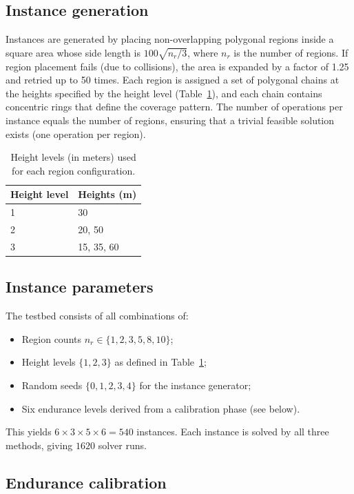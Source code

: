 \documentclass[12pt]{elsarticle}
\begin{document}
\subsection{Instance generation}
\label{sec:instance-gen}

Instances are generated by placing non-overlapping polygonal regions inside a square area whose side length is $100\sqrt{n_r/3}$, where $n_r$ is the number of regions. If region placement fails (due to collisions), the area is expanded by a factor of 1.25 and retried up to 50 times. Each region is assigned a set of polygonal chains at the heights specified by the height level (Table~\ref{tab:height-levels}), and each chain contains concentric rings that define the coverage pattern. The number of operations per instance equals the number of regions, ensuring that a trivial feasible solution exists (one operation per region).

\begin{table}[h!]
\centering
\caption{Height levels (in meters) used for each region configuration.}
\label{tab:height-levels}
\begin{tabular}{ll}
\toprule
Height level & Heights (m) \\
\midrule
1 & 30 \\
2 & 20, 50 \\
3 & 15, 35, 60 \\
\bottomrule
\end{tabular}
\end{table}

\subsection{Instance parameters}
\label{sec:params}

The testbed consists of all combinations of:
\begin{itemize}
    \item Region counts $n_r \in \{1, 2, 3, 5, 8, 10\}$;
    \item Height levels $\{1, 2, 3\}$ as defined in Table~\ref{tab:height-levels};
    \item Random seeds $\{0, 1, 2, 3, 4\}$ for the instance generator;
    \item Six endurance levels derived from a calibration phase (see below).
\end{itemize}
This yields $6 \times 3 \times 5 \times 6 = 540$ instances. Each instance is solved by all three methods, giving $1620$ solver runs.

\subsection{Endurance calibration}
\label{sec:calibration}
\end{document}
